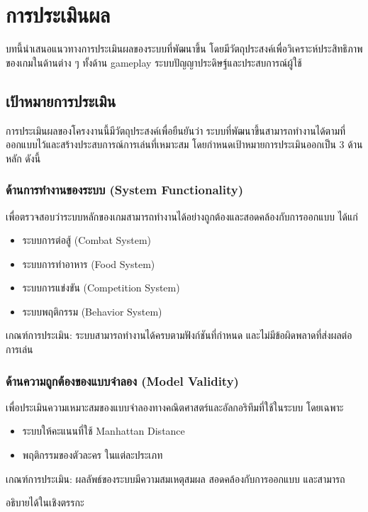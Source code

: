 \chapter{การประเมินผล}

บทนี้นำเสนอแนวทางการประเมินผลของระบบที่พัฒนาขึ้น โดยมีวัตถุประสงค์เพื่อวิเคราะห์ประสิทธิภาพของเกมในด้านต่าง ๆ ทั้งด้าน gameplay ระบบปัญญาประดิษฐ์และประสบการณ์ผู้ใช้

\section{เป้าหมายการประเมิน}

การประเมินผลของโครงงานนี้มีวัตถุประสงค์เพื่อยืนยันว่า ระบบที่พัฒนาขึ้นสามารถทำงานได้ตามที่ออกแบบไว้และสร้างประสบการณ์การเล่นที่เหมาะสม โดยกำหนดเป้าหมายการประเมินออกเป็น 3 ด้านหลัก ดังนี้

\subsection{ด้านการทำงานของระบบ (System Functionality)}

เพื่อตรวจสอบว่าระบบหลักของเกมสามารถทำงานได้อย่างถูกต้องและสอดคล้องกับการออกแบบ ได้แก่

\begin{itemize}
\item ระบบการต่อสู้ (Combat System)
\item ระบบการทำอาหาร (Food System)
\item ระบบการแข่งขัน (Competition System)
\item ระบบพฤติกรรม (Behavior System)
\end{itemize}

เกณฑ์การประเมิน: ระบบสามารถทำงานได้ครบตามฟังก์ชันที่กำหนด และไม่มีข้อผิดพลาดที่ส่งผลต่อการเล่น

\subsection{ด้านความถูกต้องของแบบจำลอง (Model Validity)}

เพื่อประเมินความเหมาะสมของแบบจำลองทางคณิตศาสตร์และอัลกอริทึมที่ใช้ในระบบ โดยเฉพาะ

\begin{itemize}
\item ระบบให้คะแนนที่ใช้ Manhattan Distance
\item พฤติกรรมของตัวละคร ในแต่ละประเภท
\end{itemize}

เกณฑ์การประเมิน: ผลลัพธ์ของระบบมีความสมเหตุสมผล สอดคล้องกับการออกแบบ และสามารถ
\par\vspace{0.5em}\noindent
อธิบายได้ในเชิงตรรกะ

